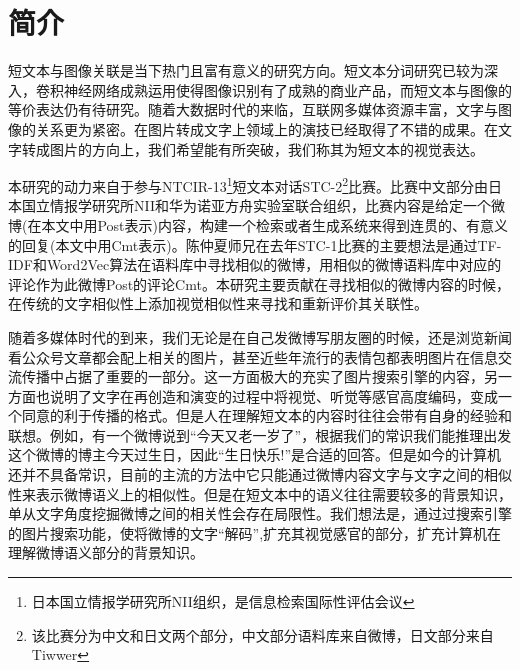 \chapter{简介}
短文本与图像关联是当下热门且富有意义的研究方向。短文本分词研究已较为深入，卷积神经网络成熟运用使得图像识别有了成熟的商业产品，而短文本与图像的等价表达仍有待研究。随着大数据时代的来临，互联网多媒体资源丰富，文字与图像的关系更为紧密。在图片转成文字上领域上的演技已经取得了不错的成果\cite{hitschler2016multimodal}。在文字转成图片的方向上，我们希望能有所突破，我们称其为短文本的视觉表达。

本研究的动力来自于参与NTCIR-13\footnote{日本国立情报学研究所NII组织，是信息检索国际性评估会议}短文本对话STC-2\footnote{该比赛分为中文和日文两个部分，中文部分语料库来自微博，日文部分来自Tiwwer }比赛。比赛中文部分由日本国立情报学研究所NII和华为诺亚方舟实验室联合组织，比赛内容是给定一个微博(在本文中用Post表示)内容，构建一个检索或者生成系统来得到连贯的、有意义的回复(本文中用Cmt表示)。陈仲夏师兄在去年STC-1比赛的主要想法是通过TF-IDF和Word2Vec算法在语料库中寻找相似的微博，用相似的微博语料库中对应的评论作为此微博Post的评论Cmt。本研究主要贡献在寻找相似的微博内容的时候，在传统的文字相似性上添加视觉相似性来寻找和重新评价其关联性。

随着多媒体时代的到来，我们无论是在自己发微博写朋友圈的时候，还是浏览新闻看公众号文章都会配上相关的图片，甚至近些年流行的表情包都表明图片在信息交流传播中占据了重要的一部分。这一方面极大的充实了图片搜索引擎的内容，另一方面也说明了文字在再创造和演变的过程中将视觉、听觉等感官高度编码，变成一个同意的利于传播的格式。但是人在理解短文本的内容时往往会带有自身的经验和联想。例如，有一个微博说到“今天又老一岁了”，根据我们的常识我们能推理出发这个微博的博主今天过生日，因此“生日快乐!”是合适的回答。但是如今的计算机还并不具备常识，目前的主流的方法中它只能通过微博内容文字与文字之间的相似性来表示微博语义上的相似性。但是在短文本中的语义往往需要较多的背景知识，单从文字角度挖掘微博之间的相关性会存在局限性。我们想法是，通过过搜索引擎的图片搜索功能，使将微博的文字“解码”,扩充其视觉感官的部分，扩充计算机在理解微博语义部分的背景知识。




